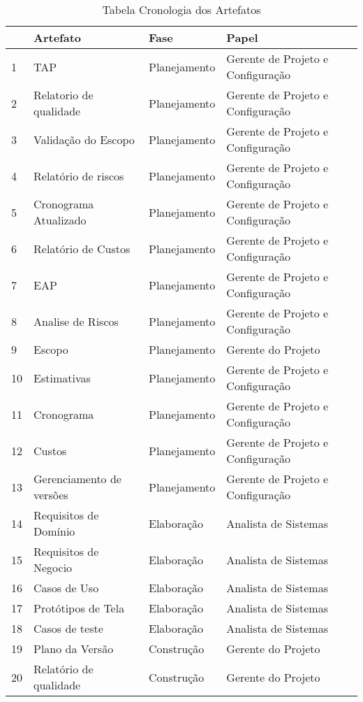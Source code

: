 \begin{table}[h!]
\centering
{}
\caption{Tabela Cronologia dos Artefatos}
\label{tab4}
\begin{tabular}{|l|l|l|l|}
\hline
 & Artefato & Fase & Papel \\ \hline
1 & TAP & Planejamento & Gerente de Projeto e Configuração \\ \hline
2 & Relatorio de qualidade & Planejamento & Gerente de Projeto e Configuração \\ \hline
3 & Validação do Escopo & Planejamento & Gerente de Projeto e Configuração \\ \hline
4 & Relatório de riscos & Planejamento & Gerente de Projeto e Configuração \\ \hline
5 & Cronograma Atualizado & Planejamento & Gerente de Projeto e Configuração \\ \hline
6 & Relatório de Custos & Planejamento & Gerente de Projeto e Configuração \\ \hline
7 & EAP & Planejamento & Gerente de Projeto e Configuração \\ \hline
8 & Analise de Riscos & Planejamento & Gerente de Projeto e Configuração \\ \hline
9 & Escopo & Planejamento & Gerente do Projeto \\ \hline
10 & Estimativas & Planejamento & Gerente de Projeto e Configuração \\ \hline
11 & Cronograma & Planejamento & Gerente de Projeto e Configuração \\ \hline
12 & Custos & Planejamento & Gerente de Projeto e Configuração \\ \hline
13 & Gerenciamento de versões & Planejamento & Gerente de Projeto e Configuração \\ \hline
14 & Requisitos de Domínio & Elaboração & Analista de Sistemas \\ \hline
15 & Requisitos de Negocio & Elaboração & Analista de Sistemas \\ \hline
16 & Casos de Uso & Elaboração & Analista de Sistemas \\ \hline
17 & Protótipos de Tela & Elaboração & Analista de Sistemas \\ \hline
18 & Casos de teste & Elaboração & Analista de Sistemas \\ \hline
19 & Plano da Versão & Construção & Gerente do Projeto \\ \hline
20 & Relatório de qualidade & Construção & Gerente do Projeto \\ \hline

\end{tabular}
\end{table}
